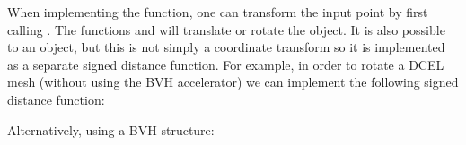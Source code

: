 \documentclass[letterpaper,10pt,english]{sphinxmanual}
\begin{document}
\sphinxAtStartPar
When implementing the  function, one can transform the input point by first calling .
The functions  and  will translate or rotate the object.
It is also possible to  an object, but this is not simply a coordinate transform so it is implemented as a separate signed distance function.
For example, in order to rotate a DCEL mesh (without using the BVH accelerator) we can implement the following signed distance function:

\begin{sphinxVerbatim}[commandchars=\\\{\}]

\end{sphinxVerbatim}

\sphinxAtStartPar
Alternatively, using a BVH structure:
\end{document}
